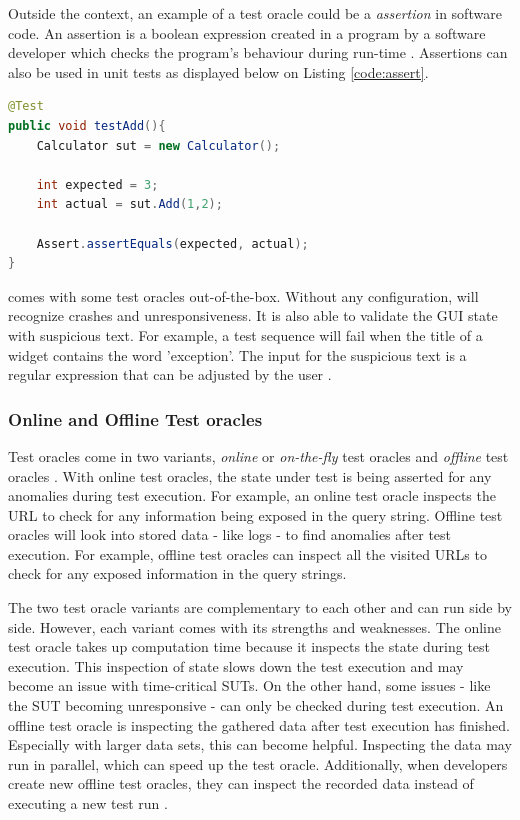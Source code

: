 Outside the \testar context, an example of a test oracle could be a \emph{assertion} in software code. An assertion is a boolean expression created in a program by a software developer which checks the program's behaviour during run-time \cite{barr2014oracle}. Assertions can also be used in unit tests as displayed below on Listing \ref{code:assert}. 

\begin{lstlisting}[language=Java, caption=Example assertion, label=code:assert]
@Test
public void testAdd(){
    Calculator sut = new Calculator();

    int expected = 3;
    int actual = sut.Add(1,2);

    Assert.assertEquals(expected, actual);
}
\end{lstlisting}

\testar comes with some test oracles out-of-the-box. Without any configuration, \testar will recognize crashes and unresponsiveness. It is also able to validate the GUI state with suspicious text. For example, a test sequence will fail when the title of a widget contains the word 'exception'. The input for the suspicious text is a regular expression that can be adjusted by the \testar user \cite{VosAho2021}. 

\subsubsection{Online and Offline Test oracles}
Test oracles come in two variants, \emph{online} or \emph{on-the-fly} test oracles and \emph{offline} test oracles \cite{VosAho2021}. With online test oracles, the state under test is being asserted for any anomalies during test execution. For example,  an online test oracle inspects the URL to check for any information being exposed in the query string. Offline test oracles will look into stored data - like logs - to find anomalies after test execution. For example, offline test oracles can inspect all the visited URLs to check for any exposed information in the query strings.

The two test oracle variants are complementary to each other and can run side by side. However, each variant comes with its strengths and weaknesses. The online test oracle takes up computation time because it inspects the state during test execution. This inspection of state slows down the test execution and may become an issue with time-critical SUTs. On the other hand, some issues - like the SUT becoming unresponsive - can only be checked during test execution. An offline test oracle is inspecting the gathered data after test execution has finished. Especially with larger data sets, this can become helpful. Inspecting the data may run in parallel, which can speed up the test oracle. Additionally, when developers create new offline test oracles, they can inspect the recorded data instead of executing a new test run \cite{de2019offline}.

